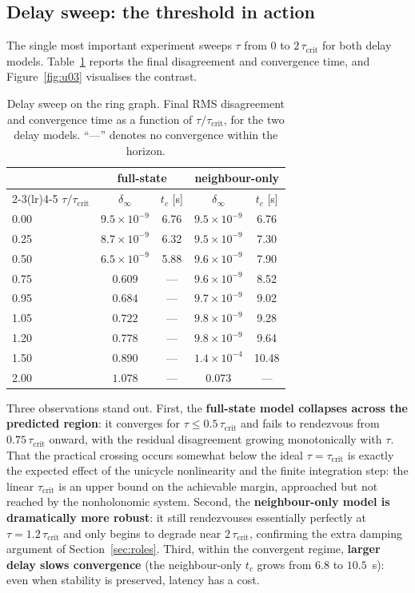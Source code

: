 \documentclass[11pt,a4paper]{article}
\newcommand{\taucrit}{\tau_{\mathrm{crit}}}
\begin{document}
\subsection{Delay sweep: the threshold in action}
\label{sec:sweep}

The single most important experiment sweeps $\tau$ from $0$ to $2\,\taucrit$ for both delay
models. Table~\ref{tab:sweep} reports the final disagreement and convergence time, and
Figure~\ref{fig:u03} visualises the contrast.

\begin{table}[h]
\centering
\caption{Delay sweep on the ring graph. Final RMS disagreement and convergence time as a
function of $\tau/\taucrit$, for the two delay models. ``---'' denotes no convergence within
the horizon.}
\label{tab:sweep}
\small
\begin{tabular}{lcccc}
\toprule
& \multicolumn{2}{c}{\textbf{full-state}} & \multicolumn{2}{c}{\textbf{neighbour-only}}\\
\cmidrule(lr){2-3}\cmidrule(lr){4-5}
$\tau/\taucrit$ & $\delta_\infty$ & $t_c$ [s] & $\delta_\infty$ & $t_c$ [s]\\
\midrule
0.00 & $9.5\times10^{-9}$ & 6.76 & $9.5\times10^{-9}$ & 6.76\\
0.25 & $8.7\times10^{-9}$ & 6.32 & $9.5\times10^{-9}$ & 7.30\\
0.50 & $6.5\times10^{-9}$ & 5.88 & $9.6\times10^{-9}$ & 7.90\\
0.75 & $0.609$ & --- & $9.6\times10^{-9}$ & 8.52\\
0.95 & $0.684$ & --- & $9.7\times10^{-9}$ & 9.02\\
1.05 & $0.722$ & --- & $9.8\times10^{-9}$ & 9.28\\
1.20 & $0.778$ & --- & $9.8\times10^{-9}$ & 9.64\\
1.50 & $0.890$ & --- & $1.4\times10^{-4}$ & 10.48\\
2.00 & $1.078$ & --- & $0.073$ & ---\\
\bottomrule
\end{tabular}
\end{table}

Three observations stand out. First, the \textbf{full-state model collapses across the
predicted region}: it converges for $\tau\le0.5\,\taucrit$ and fails to rendezvous from
$0.75\,\taucrit$ onward, with the residual disagreement growing monotonically with $\tau$.
That the practical crossing occurs somewhat below the ideal $\tau=\taucrit$ is exactly the
expected effect of the unicycle nonlinearity and the finite integration step: the linear
$\taucrit$ is an upper bound on the achievable margin, approached but not reached by the
nonholonomic system. Second, the \textbf{neighbour-only model is dramatically more robust}: it
still rendezvouses essentially perfectly at $\tau=1.2\,\taucrit$ and only begins to degrade
near $2\,\taucrit$, confirming the extra damping argument of Section~\ref{sec:roles}. Third,
within the convergent regime, \textbf{larger delay slows convergence} (the neighbour-only
$t_c$ grows from $6.8$ to $10.5$~s): even when stability is preserved, latency has a cost.
\end{document}
